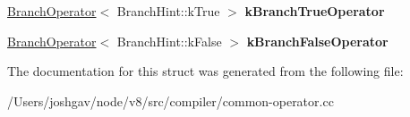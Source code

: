 \begin{DoxyCompactItemize}
\item 
\hyperlink{structv8_1_1internal_1_1compiler_1_1_common_operator_global_cache_1_1_branch_operator}{Branch\+Operator}$<$ Branch\+Hint\+::k\+True $>$ {\bfseries k\+Branch\+True\+Operator}\hypertarget{structv8_1_1internal_1_1compiler_1_1_common_operator_global_cache_a2046e6a633bf4aa5060940d3c8f67fc0}{}\label{structv8_1_1internal_1_1compiler_1_1_common_operator_global_cache_a2046e6a633bf4aa5060940d3c8f67fc0}

\item 
\hyperlink{structv8_1_1internal_1_1compiler_1_1_common_operator_global_cache_1_1_branch_operator}{Branch\+Operator}$<$ Branch\+Hint\+::k\+False $>$ {\bfseries k\+Branch\+False\+Operator}\hypertarget{structv8_1_1internal_1_1compiler_1_1_common_operator_global_cache_afa9845c01622ac70c7c7044765483a4c}{}\label{structv8_1_1internal_1_1compiler_1_1_common_operator_global_cache_afa9845c01622ac70c7c7044765483a4c}

\end{DoxyCompactItemize}


The documentation for this struct was generated from the following file\+:\begin{DoxyCompactItemize}
\item 
/\+Users/joshgav/node/v8/src/compiler/common-\/operator.\+cc\end{DoxyCompactItemize}
